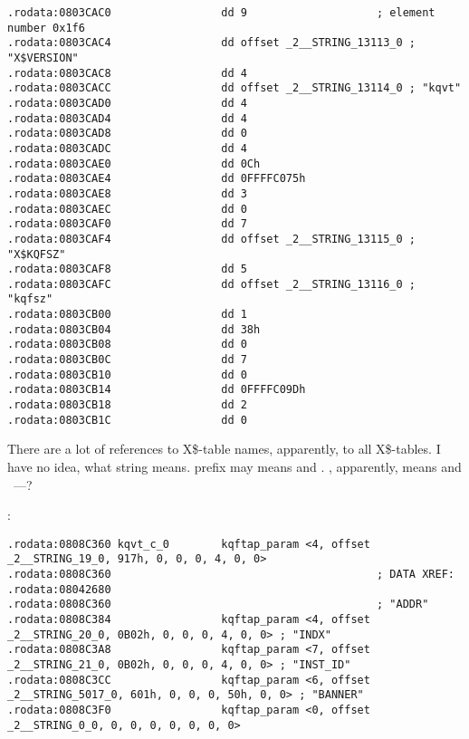 \begin{lstlisting}[caption=kqf.o]
.rodata:0803CAC0                 dd 9                    ; element number 0x1f6
.rodata:0803CAC4                 dd offset _2__STRING_13113_0 ; "X$VERSION"
.rodata:0803CAC8                 dd 4
.rodata:0803CACC                 dd offset _2__STRING_13114_0 ; "kqvt"
.rodata:0803CAD0                 dd 4
.rodata:0803CAD4                 dd 4
.rodata:0803CAD8                 dd 0
.rodata:0803CADC                 dd 4
.rodata:0803CAE0                 dd 0Ch
.rodata:0803CAE4                 dd 0FFFFC075h
.rodata:0803CAE8                 dd 3
.rodata:0803CAEC                 dd 0
.rodata:0803CAF0                 dd 7
.rodata:0803CAF4                 dd offset _2__STRING_13115_0 ; "X$KQFSZ"
.rodata:0803CAF8                 dd 5
.rodata:0803CAFC                 dd offset _2__STRING_13116_0 ; "kqfsz"
.rodata:0803CB00                 dd 1
.rodata:0803CB04                 dd 38h
.rodata:0803CB08                 dd 0
.rodata:0803CB0C                 dd 7
.rodata:0803CB10                 dd 0
.rodata:0803CB14                 dd 0FFFFC09Dh
.rodata:0803CB18                 dd 2
.rodata:0803CB1C                 dd 0
\end{lstlisting}

{There are a lot of references to X\$-table names, apparently, to all  X\$-tables.}
{I have no idea, what  string means.} 
{ prefix may means  and .} 
{, apparently, means  and ~---?} 

 :

\begin{lstlisting}[caption=kqf.o]
.rodata:0808C360 kqvt_c_0        kqftap_param <4, offset _2__STRING_19_0, 917h, 0, 0, 0, 4, 0, 0>
.rodata:0808C360                                         ; DATA XREF: .rodata:08042680
.rodata:0808C360                                         ; "ADDR"
.rodata:0808C384                 kqftap_param <4, offset _2__STRING_20_0, 0B02h, 0, 0, 0, 4, 0, 0> ; "INDX"
.rodata:0808C3A8                 kqftap_param <7, offset _2__STRING_21_0, 0B02h, 0, 0, 0, 4, 0, 0> ; "INST_ID"
.rodata:0808C3CC                 kqftap_param <6, offset _2__STRING_5017_0, 601h, 0, 0, 0, 50h, 0, 0> ; "BANNER"
.rodata:0808C3F0                 kqftap_param <0, offset _2__STRING_0_0, 0, 0, 0, 0, 0, 0, 0>
\end{lstlisting}

